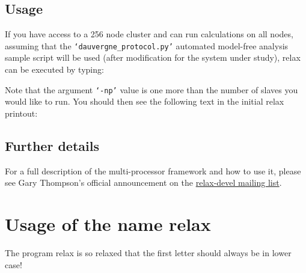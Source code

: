 
\subsection{Usage}

If you have access to a 256 node cluster and can run calculations on all nodes, assuming that the \texttt{`dauvergne\_protocol.py'} automated model-free analysis sample script will be used (after modification for the system under study), relax can be executed by typing:


Note that the argument \texttt{`-np'} value is one more than the number of slaves you would like to run.  You should then see the following text in the initial relax printout:





\subsection{Further details}

For a full description of the multi-processor framework and how to use it, please see Gary Thompson's official announcement on the \href{https://mail.gna.org/public/relax-devel/2007-05/msg00000.html}{relax-devel mailing list}.




\section{Usage of the name relax}

The program relax is so relaxed that the first letter should always be in lower case!
